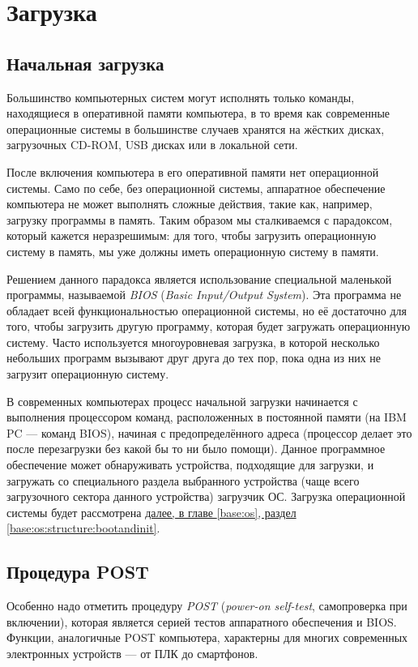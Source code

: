 \section{Загрузка}\label{base:introduction:bootup}
\subsection{Начальная загрузка}\label{base:introduction:bootup:BIOS}
Большинство компьютерных систем могут исполнять только команды, находящиеся в оперативной памяти компьютера, в то время как современные операционные системы в большинстве случаев хранятся на жёстких дисках, загрузочных CD-ROM, USB дисках или в локальной сети.

После включения компьютера в его оперативной памяти нет операционной системы. Само по себе, без операционной системы, аппаратное обеспечение компьютера не может выполнять сложные действия, такие как, например, загрузку программы в память.
Таким образом мы сталкиваемся с парадоксом, который кажется неразрешимым: для того, чтобы загрузить операционную систему в память, мы уже должны иметь операционную систему в памяти.

Решением данного парадокса является использование специальной маленькой программы, называемой \emph{BIOS} (\emph{Basic Input/Output System}). Эта программа не обладает всей функциональностью операционной системы, но её достаточно для того, чтобы загрузить другую программу, которая будет загружать операционную систему.
Часто используется многоуровневая загрузка, в которой несколько небольших программ вызывают друг друга до тех пор, пока одна из них не загрузит операционную систему.

В современных компьютерах процесс начальной загрузки начинается с выполнения процессором команд, расположенных в постоянной памяти (на IBM PC --- команд BIOS), начиная с предопределённого адреса (процессор делает это после перезагрузки без какой бы то ни было помощи).
Данное программное обеспечение может обнаруживать устройства, подходящие для загрузки, и загружать со специального раздела выбранного устройства (чаще всего загрузочного сектора данного устройства) загрузчик ОС. Загрузка операционной системы будет рассмотрена \hyperref[base:os:structure:bootandinit]{далее, в главе \ref*{base:os}, раздел \ref*{base:os:structure:bootandinit}}.

\subsection{Процедура POST}\label{base:introduction:bootup:post}
Особенно надо отметить процедуру \emph{POST} (\emph{power-on self-test}, самопроверка при включении), которая является серией тестов аппаратного обеспечения и BIOS. Функции, аналогичные POST компьютера, характерны для многих современных электронных устройств --- от ПЛК до смартфонов.

